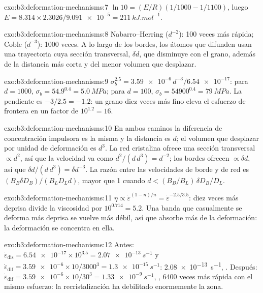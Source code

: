 \begin{solution}{exo:b3:deformation-mechanisms:7}
$\ln10 = (E/R)(1/1000 - 1/1100)$, luego $E = 8.314\times2.3026/\num{9.091e-5} =
\qty{211}{kJ.mol^{-1}}$.
\end{solution}

\begin{solution}{exo:b3:deformation-mechanisms:8}
Nabarro--Herring ($d^{-2}$): 100 veces más rápida; Coble ($d^{-3}$): 1000 veces.
A lo largo de los bordes, los átomos que difunden usan una trayectoria cuya sección transversal, $\delta
d$, que disminuye con el grano, además de la distancia más corta y del
menor volumen que desplazar.
\end{solution}

\begin{solution}{exo:b3:deformation-mechanisms:9}
$\sigma_b^{2.5} = \num{3.59e-6}\,d^{-3}/\num{6.54e-17}$: para $d = 1000$,
$\sigma_b = 54.9^{0.4} = \qty{5.0}{MPa}$; para $d = 100$, $\sigma_b =
\num{54900}^{0.4} = \qty{79}{MPa}$. La pendiente es $-3/2.5 = -1.2$: un
grano diez veces más fino eleva el esfuerzo de frontera en un factor de $10^{1.2} = 16$.
\end{solution}

\begin{solution}{exo:b3:deformation-mechanisms:10}
En ambos caminos la diferencia de concentración impulsora es la misma y la
distancia es $d$; el volumen que desplazar por unidad de deformación es $d^3$. La red cristalina
ofrece una sección transversal $\propto d^2$, así que la velocidad va como $d^2/(d\,d^3) =
d^{-2}$; los bordes ofrecen $\propto\delta d$, así que $\delta d/(d\,d^3) = \delta
d^{-3}$. La razón entre las velocidades de borde y de red es $(B_B\delta D_B)/(B_LD_Ld)$,
mayor que 1 cuando $d < (B_B/B_L)\,\delta D_B/D_L$.
\end{solution}

\begin{solution}{exo:b3:deformation-mechanisms:11}
$\eta \propto \dot\varepsilon^{(1-n)/n} = \dot\varepsilon^{-2.5/3.5}$: diez veces
más deprisa divide la viscosidad por $10^{0.714} = 5.2$. Una banda que casualmente
se deforma más deprisa se vuelve más débil, así que absorbe más de la deformación:
la deformación se concentra en ella.
\end{solution}

\begin{solution}{exo:b3:deformation-mechanisms:12}
Antes: $\dot\varepsilon_{\mathrm{dis}} = \num{6.54e-17}\times10^{3.5} =
\qty{2.07e-13}{s^{-1}}$ y $\dot\varepsilon_{\mathrm{dif}} = \num{3.59e-6}
\times10/3000^3 = \qty{1.3e-15}{s^{-1}}$: \qty{2.08e-13}{s^{-1}}, . Después: $\dot\varepsilon_{\mathrm{dif}} = \num{3.59e-6}\times10/30^3 =
\qty{1.33e-9}{s^{-1}}$, , \num{6400} veces más rápida con el mismo
esfuerzo: la recristalización ha debilitado enormemente la zona.
\end{solution}

